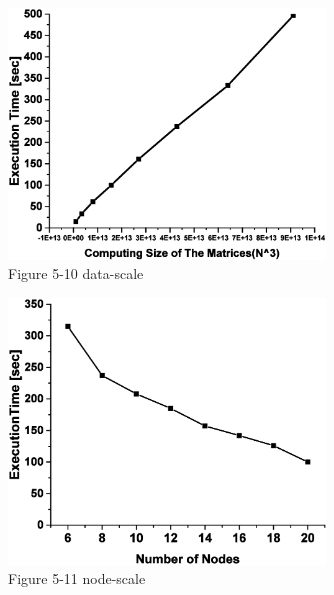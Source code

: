 \documentclass[onecolumn]{ieeetran}
\begin{document}
\begin{figure}[ht]
  \centering\captionsetup{justification=centering}
  \includegraphics[width=0.75\textwidth]{Figure_5-10_data-scale.eps}
  \caption{Figure 5-10 data-scale}\label{Figure_5-10_data-scale}
\end{figure}

\clearpage\begin{figure}[ht]
  \centering\captionsetup{justification=centering}
  \includegraphics[width=0.75\textwidth]{Figure_5-11_node-scale.eps}
  \caption{Figure 5-11 node-scale}\label{Figure_5-11_node-scale}
\end{figure}
\clearpage
\end{document}
